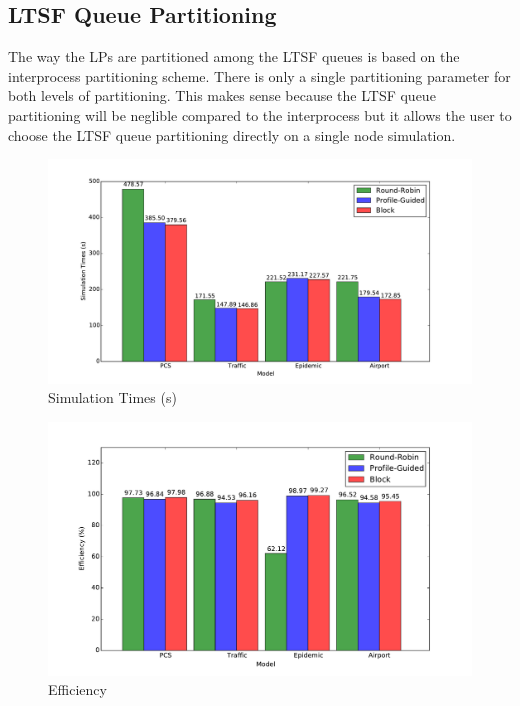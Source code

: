 \documentclass[11pt]{book}
\begin{document}
\subsection{LTSF Queue Partitioning}

The way the LPs are partitioned among the LTSF queues is based on the interprocess partitioning
scheme. There is only a single partitioning parameter for both levels of partitioning. This makes
sense because the LTSF queue partitioning will be neglible compared to the interprocess but
it allows the user to choose the LTSF queue partitioning directly on a single node
simulation.

\begin{figure}
  \begin{minipage}{.5\textwidth}
    \begin{center}
      \includegraphics[width=\textwidth,keepaspectratio,quiet]{figs/partitioning_communication/partitioning_time_1node.pdf} \\
      Simulation Times (s) \\
    \end{center}
  \end{minipage}%
  \hfill
  \begin{minipage}{.5\textwidth}
    \begin{center}
      \includegraphics[width=\textwidth,keepaspectratio,quiet]{figs/partitioning_communication/partitioning_efficiency_1node.pdf} \\
      Efficiency \\
    \end{center}
  \end{minipage}
\end{figure}
\end{document}
